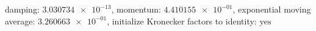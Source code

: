 damping: $\num[scientific-notation=true]{3.030734e-13}$, momentum: $\num[scientific-notation=true]{4.410155e-01}$, exponential moving average: $\num[scientific-notation=true]{3.260663e-01}$, initialize Kronecker factors to identity: $\text{yes}$